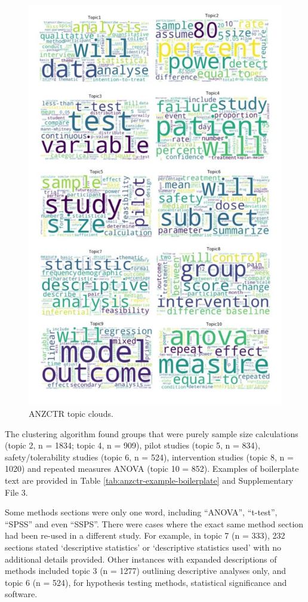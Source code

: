 \documentclass[12pt]{article}
\begin{document}
\begin{figure}

{\centering \includegraphics[width=0.7\linewidth]{figures/anzctr.wordclouds} 

}

\caption{ANZCTR topic clouds.}\label{fig:unnamed-chunk-8}
\end{figure}

The clustering algorithm found groups that were purely sample size
calculations (topic 2, n = 1834; topic 4, n = 909), pilot studies (topic
5, n = 834), safety/tolerability studies (topic 6, n = 524),
intervention studies (topic 8, n = 1020) and repeated measures ANOVA
(topic 10 = 852). Examples of boilerplate text are provided in Table
\ref{tab:anzctr-example-boilerplate} and Supplementary File 3.

Some methods sections were only one word, including ``ANOVA'',
``t-test'', ``SPSS'' and even ``SSPS''. There were cases where the exact
same method section had been re-used in a different study. For example,
in topic 7 (n = 333), 232 sections stated `descriptive statistics' or
`descriptive statistics used' with no additional details provided. Other
instances with expanded descriptions of methods included topic 3 (n =
1277) outlining descriptive analyses only, and topic 6 (n = 524), for
hypothesis testing methods, statistical significance and software.
\end{document}
